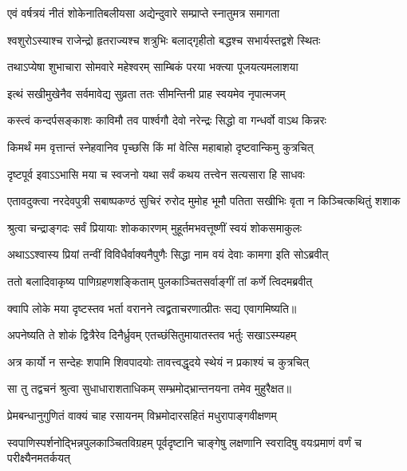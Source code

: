 \twolineshloka
{एवं वर्षत्रयं नीतं शोकेनातिबलीयसा}
{अद्येन्दुवारे सम्प्राप्ते स्नातुमत्र समागता} %

\twolineshloka
{श्वशुरोऽस्याश्च राजेन्द्रो हृतराज्यश्च शत्रुभिः}
{बलाद्गृहीतो बद्धश्च सभार्यस्तद्वशे स्थितः} %

\twolineshloka
{तथाऽप्येषा शुभाचारा सोमवारे महेश्वरम्}
{साम्बिकं परया भक्त्या पूजयत्यमलाशया} %

\twolineshloka
{इत्थं सखीमुखेनैव सर्वमावेद्य सुव्रता}
{ततः सीमन्तिनी प्राह स्वयमेव नृपात्मजम्} %

\twolineshloka
{कस्त्वं कन्दर्पसङ्काशः काविमौ तव पार्श्वगौ}
{देवो नरेन्द्रः सिद्धो वा गन्धर्वो वाऽथ किन्नरः} %

\twolineshloka
{किमर्थं मम वृत्तान्तं स्नेहवानिव पृच्छसि}
{किं मां वेत्सि महाबाहो दृष्टवान्किमु कुत्रचित्} %

\twolineshloka
{दृष्टपूर्व इवाऽऽभासि मया च स्वजनो यथा}
{सर्वं कथय तत्त्वेन सत्यसारा हि साधवः} %

\fourlineindentedshloka
{एतावदुक्त्वा नरदेवपुत्री}
{सबाष्पकण्ठं सुचिरं रुरोद}
{मुमोह भूमौ पतिता सखीभिः}
{वृता न किञ्चित्कथितुं शशाक} %

\twolineshloka
{श्रुत्वा चन्द्राङ्गदः सर्वं प्रियायाः शोककारणम्}
{मुहूर्तमभवत्तूष्णीं स्वयं शोकसमाकुलः} %

\twolineshloka
{अथाऽऽश्वास्य प्रियां तन्वीं विविधैर्वाक्यनैपुणैः}
{सिद्धा नाम वयं देवाः कामगा इति सोऽब्रवीत्} %

\twolineshloka
{ततो बलादिवाकृष्य पाणिग्रहणशङ्किताम्}
{पुलकाञ्चितसर्वाङ्गीं तां कर्णे त्विदमब्रवीत्} %

\twolineshloka
{क्वापि लोके मया दृष्टस्तव भर्ता वरानने}
{त्वद्व्रताचरणात्प्रीतः सद्य एवागमिष्यति॥} %

\twolineshloka
{अपनेष्यति ते शोकं द्वित्रैरेव दिनैर्ध्रुवम्}
{एतच्छंसितुमायातस्तव भर्तुः सखाऽस्म्यहम्} %

\twolineshloka
{अत्र कार्यो न सन्देहः शपामि शिवपादयोः}
{तावत्त्वद्धृदये स्थेयं न प्रकाश्यं च कुत्रचित्} %

\twolineshloka
{सा तु तद्वचनं श्रुत्वा सुधाधाराशताधिकम्}
{सम्भ्रमोद्भ्रान्तनयना तमेव मुहुरैक्षत॥} %

\twolineshloka
{प्रेमबन्धानुगुणितं वाक्यं चाह रसायनम्}
{विभ्रमोदारसहितं मधुरापाङ्गवीक्षणम्} %

\threelineshloka
{स्वपाणिस्पर्शनोद्भिन्नपुलकाञ्चितविग्रहम्}
{पूर्वदृष्टानि चाङ्गेषु लक्षणानि स्वरादिषु}
{वयःप्रमाणं वर्णं च परीक्ष्यैनमतर्कयत्} %

